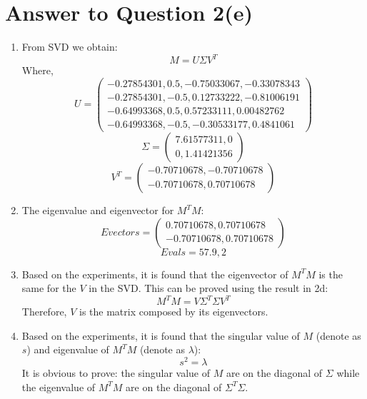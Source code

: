 \documentclass[11pt]{article}
\begin{document}
\section*{Answer to Question 2(e)}
\begin{enumerate}
\item
From SVD we obtain:
\begin{equation*}
    M = U\Sigma V^T
\end{equation*}
Where,
$$
U = 
\begin{pmatrix}
    -0.27854301, 0.5, -0.75033067, -0.33078343\\
    -0.27854301, -0.5, 0.12733222, -0.81006191\\
    -0.64993368, 0.5, 0.57233111, 0.00482762\\
    -0.64993368, -0.5, -0.30533177, 0.4841061
\end{pmatrix}
$$
$$
\Sigma = 
\begin{pmatrix}
    7.61577311, 0\\
    0, 1.41421356
\end{pmatrix}
$$
$$
V^T = 
\begin{pmatrix}
    -0.70710678, -0.70710678\\
    -0.70710678, 0.70710678
\end{pmatrix}
$$
\item
The eigenvalue and eigenvector for $M^TM$:
$$
Evectors =
\begin{pmatrix}
    0.70710678, 0.70710678\\
    -0.70710678, 0.70710678
\end{pmatrix}
$$
$$
    Evals = 57.9, 2
$$

\item
Based on the experiments, it is found that the eigenvector of $M^TM$ is the same for the $V$ in the SVD.
This can be proved using the result in 2d:
$$
    M^TM = V\Sigma^T\Sigma V^T
$$
Therefore, $V$ is the matrix composed by its eigenvectors.

\item
Based on the experiments, it is found that the singular value of $M$ (denote as $s$) and eigenvalue of $M^TM$ (denote as $\lambda$):
\begin{equation}
    s^2 = \lambda
\end{equation}
It is obvious to prove: the singular value of $M$ are on the diagonal of $\Sigma$ while the eigenvalue of $M^TM$ are on the diagonal of $\Sigma^T\Sigma$.

\end{enumerate}
\end{document}
